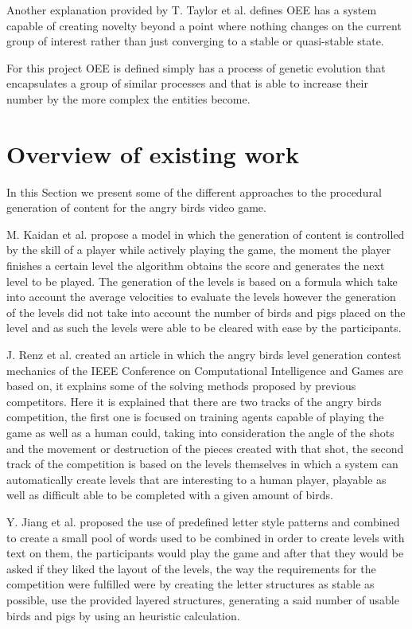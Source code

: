 \documentclass[graybox]{svmult}
\begin{document}
Another explanation provided by T. Taylor et al. \cite{Taylor2016} defines OEE has a system capable of creating novelty beyond a point where nothing changes on the current group of interest rather than just converging to a stable or quasi-stable state.

For this project OEE is defined simply has a process of genetic evolution that encapsulates a group of similar processes and that is able to increase their number by the more complex the entities become.

\section{Overview of existing work}

In this Section we present some of the different approaches to the procedural generation of content for the angry birds video game.

M. Kaidan et al. \cite{Kaidan2015} propose a model in which the generation of content is controlled by the skill of a player while actively playing the game, the moment the player finishes a certain level the algorithm obtains the score and generates the next level to be played. The generation of the levels is based on a formula which take into account the average velocities to evaluate the levels however the generation of the levels did not take into account the number of birds and pigs placed on the level and as such the levels were able to be cleared with ease by the participants. 

J. Renz et al. \cite{Renz} created an article in which the angry birds level generation contest mechanics of the IEEE Conference on Computational Intelligence and Games are based on, it explains some of the solving methods proposed by previous competitors. Here it is explained that there are two tracks of the angry birds competition, the first one is focused on training agents capable of playing the game as well as a human could, taking into consideration the angle of the shots and the movement or destruction of the pieces created with that shot, the second track of the competition is based on the levels themselves in which a system can automatically create levels that are interesting to a human player, playable as well as difficult able to be completed with a given amount of birds.

Y. Jiang et al. \cite{Jiang2017} proposed the use of predefined letter style patterns and combined to create a small pool of words used to be combined in order to create levels with text on them, the participants would play the game and after that they would be asked if they liked the layout of the levels, the way the requirements for the competition were fulfilled were by creating the letter structures as stable as possible, use the provided layered structures, generating a said number of usable birds and pigs by using an heuristic calculation.
\end{document}

